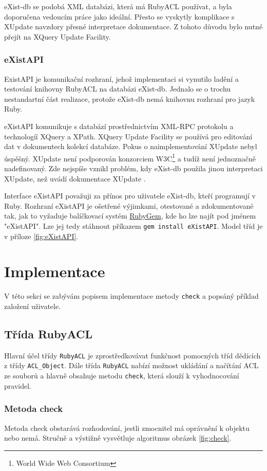 eXist-db se podobá XML databázi, která má RubyACL používat, a byla doporučena vedoucím práce jako ideální. Přesto se vyskytly komplikace s XUpdate navzdory přesné interpretace dokumentace. Z tohoto důvodu bylo nutné přejít na XQuery Update Facility.

\subsubsection{eXistAPI}
ExistAPI je komunikační rozhraní, jehož implementaci si vynutilo ladění a testování knihovny RubyACL na databázi eXist-db. Jednalo se o trochu nestandartní část realizace, protože eXist-db nemá knihovnu rozhraní pro jazyk Ruby.

eXistAPI komunikuje s databází prostřednictvím XML-RPC protokolu a technologíí XQuery a XPath. XQuery Update Facility se používá pro editování dat v dokumentech kolekcí databáze.
Pokus o naimplementování XUpdate nebyl úspěšný. XUpdate není podporován konzorciem W3C\footnote{World Wide Web Consortium} a tudíž není jednoznačně nadefinovaný. Zde nejspíše vznikl problém, kdy eXist-db použila jinou interpretaci XUpdate, než uvádí dokumentace XUpdate \cite{xupdate}.

Interface eXistAPI považuji za přínos pro uživatele eXist-db, kteří programují v Ruby. Rozhraní eXistAPI je ošetřené výjimkami, otestované a zdokumentované tak, jak to vyžaduje balíčkovací systém \href{https://rubygems.org/}{RubyGem}, kde ho lze najít pod jménem "eXistAPI". Lze jej tedy stáhnout příkazem \verb|gem install eXistAPI|. Model tříd je v příloze \ref{fig:eXistAPI}. 

\section{Implementace}
V této sekci se zabývám popisem implementace metody \verb|check| a popsáný příklad založení uživatele.

\subsection{Třída RubyACL}

Hlavní účel třídy \verb|RubyACL| je zprostředkovávat funkčnost pomocných tříd dědících z třídy \verb|ACL_Object|. Dále třída \verb|RubyACL| nabízí možnost ukládání a načítání ACL ze souborů a hlavně obsahuje metodu \verb|check|, která slouží k vyhodnocování pravidel.

\subsubsection{Metoda check}
Metoda check obstarává rozhodování, jestli zmocnitel má oprávnění k objektu nebo nemá. Stručně a výstižně vysvětluje algoritmus obrázek \ref{fig:check}. 

